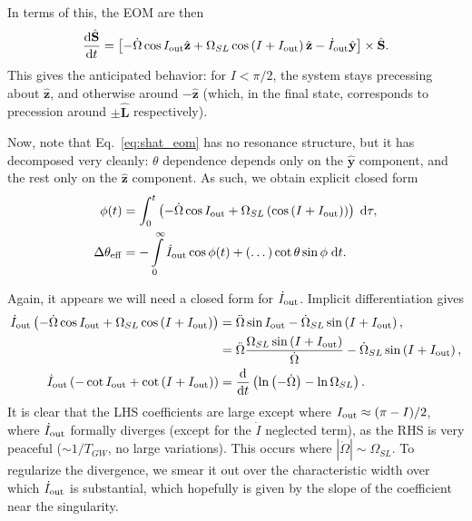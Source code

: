 \documentclass[11pt,
        usenames, %
        dvipsnames %
    ]{article}
\newcommand*{\rd}[2]{\frac{\mathrm{d}#1}{\mathrm{d}#2}}
\newcommand*{\bm}[1]{\boldsymbol{\mathbf{#1}}}
\newcommand*{\uv}[1]{\hat{\bm{#1}}}
\newcommand*{\abs}[1]{\left|#1\right|}
\newcommand*{\p}[1]{\left(#1\right)}
\newcommand*{\s}[1]{\left[#1\right]}
\begin{document}
In terms of this, the EOM are then
\begin{equation}
    \rd{\uv{S}}{t} = \s{-\dot{\Omega} \cos I_{\rm out}\uv{z} + \Omega_{SL}
        \cos \p{I + I_{\rm out}}\uv{z} - \dot{I}_{\rm out}\uv{y}} \times
        \uv{S}.\label{eq:shat_eom}
\end{equation}
This gives the anticipated behavior: for $I < \pi/2$, the system stays
precessing about $\uv{z}$, and otherwise around $-\uv{z}$ (which, in the final
state, corresponds to precession around $\pm \uv{L}$ respectively).

Now, note that Eq.~\eqref{eq:shat_eom} has no resonance structure, but it has
decomposed very cleanly: $\theta$ dependence depends only on the $\uv{y}$
component, and the rest only on the $\uv{z}$ component. As such, we obtain
explicit closed form
\begin{align}
    \phi(t) &= \int_0^t \p{-\dot{\Omega}\cos I_{\rm out}
            + \Omega_{SL}\p{\cos \p{I + I_{\rm out}}}}\;\mathrm{d}\tau,\\
    \Delta \theta_{\rm eff}
        &= -\int\limits_0^\infty \dot{I}_{\rm out}\cos \phi(t)
            + (\dots) \cot \theta \sin \phi \;\mathrm{d}t.
\end{align}

Again, it appears we will need a closed form for $\dot{I}_{\rm out}$. Implicit
differentiation gives
\begin{align}
    \dot{I}_{\rm out}\p{-\dot{\Omega}\cos I_{\rm out}
        + \Omega_{SL}\cos\p{I + I_{\rm out}}}
        &= \ddot{\Omega} \sin I_{\rm out} - \dot{\Omega}_{SL}
            \sin\p{I + I_{\rm out}},\\
        &= \ddot{\Omega}\frac{\Omega_{SL}\sin\p{I + I_{\rm out}}}{\dot{\Omega}}
            - \dot{\Omega}_{SL}\sin\p{I + I_{\rm out}},\\
    \dot{I}_{\rm out}\p{-\cot I_{\rm out} + \cot \p{I + I_{\rm out}}}
        &= \rd{}{t}\p{\ln \p{-\dot{\Omega}} - \ln
        \Omega_{SL}}.\label{eq:idot_out_sol}
\end{align}
It is clear that the LHS coefficients are large except where $I_{\rm out}
\approx (\pi - I) / 2$, where $\dot{I}_{\rm out}$ formally diverges (except for
the $\dot{I}$ neglected term), as the RHS is very peaceful ($\sim 1/T_{GW}$, no
large variations). This occurs where $\abs{\dot{\Omega}} \sim \Omega_{SL}$. To
regularize the divergence, we smear it out over the characteristic width over
which $\dot{I}_{\rm out}$ is substantial, which hopefully is given by the slope
of the coefficient near the singularity.
\end{document}
